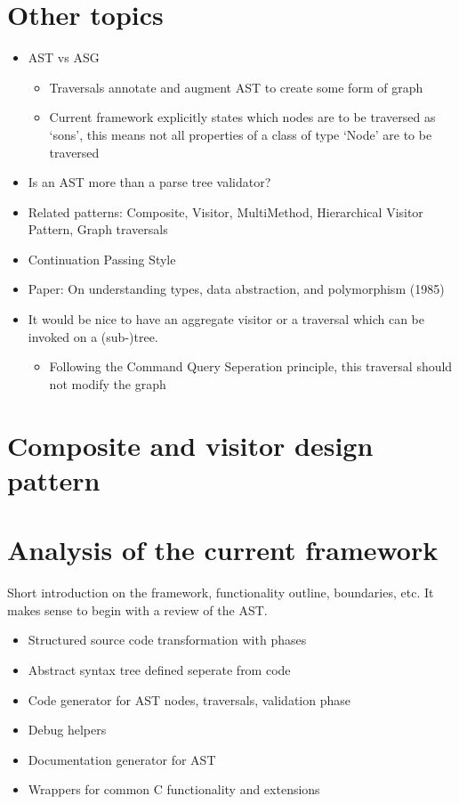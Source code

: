 \documentclass[final,a4paper,12pt]{article}
\begin{document}
\section*{Other topics}
\begin{itemize}
	\item AST vs ASG
	\begin{itemize}
		\item Traversals annotate and augment AST to create some form of graph
		\item Current framework explicitly states which nodes are to be traversed as `sons', this means not all properties of a class of type `Node' are to be traversed
	\end{itemize}
	\item Is an AST more than a parse tree validator? 
	\item Related patterns: Composite, Visitor, MultiMethod, Hierarchical Visitor Pattern, Graph traversals
	\item Continuation Passing Style
	\item Paper: On understanding types, data abstraction, and polymorphism (1985)
	\item It would be nice to have an aggregate visitor or a traversal which can be invoked on a (sub-)tree.
	\begin{itemize}
		\item Following the Command Query Seperation principle, this traversal should not modify the graph
	\end{itemize}
\end{itemize}
\clearpage

\section*{Composite and visitor design pattern}



\section{Analysis of the current framework}
Short introduction on the framework, functionality outline, boundaries, etc. It makes sense to begin with a review of the AST.
\begin{itemize}
	\item Structured source code transformation with phases
	\item Abstract syntax tree defined seperate from code
	\item Code generator for AST nodes, traversals, validation phase
	\item Debug helpers
	\item Documentation generator for AST
	\item Wrappers for common C functionality and extensions
\end{itemize}
\end{document}
